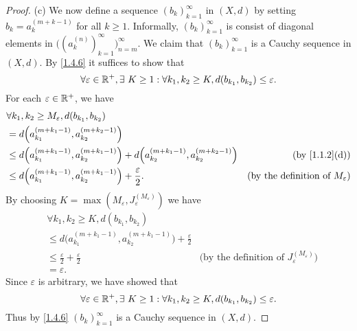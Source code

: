 \begin{proof}{(c)}
  We now define a sequence \((b_k)_{k = 1}^\infty\) in \((X, d)\) by setting \(b_k = a_k^{(m + k - 1)}\) for all \(k \geq 1\).
  Informally, \((b_k)_{k = 1}^\infty\) is consist of diagonal elements in \(\big((a_k^{(n)})_{k = 1}^\infty\big)_{n = m}^\infty\).
  We claim that \((b_k)_{k = 1}^\infty\) is a Cauchy sequence in \((X, d)\).
  By \cref{1.4.6} it suffices to show that
  \[
    \forall \varepsilon \in \mathbb{R}^+, \exists\ K \geq 1 : \forall k_1, k_2 \geq K, d(b_{k_1}, b_{k_2}) \leq \varepsilon.
  \]
  For each \(\varepsilon \in \mathbb{R}^+\), we have
  \begin{align*}
     & \forall k_1, k_2 \geq M_\varepsilon, d(b_{k_1}, b_{k_2})                                                                                                                         \\
     & = d\Big(a_{k_1}^{(m + k_1 - 1)}, a_{k_2}^{(m + k_2 - 1)}\Big)                                                                                                                    \\
     & \leq d\Big(a_{k_1}^{(m + k_1 - 1)}, a_{k_2}^{(m + k_1 - 1)}\Big) + d\Big(a_{k_2}^{(m + k_1 - 1)}, a_{k_2}^{(m + k_2 - 1)}\Big) & \text{(by \cref{1.1.2}(d))}                     \\
     & \leq d\Big(a_{k_1}^{(m + k_1 - 1)}, a_{k_2}^{(m + k_1 - 1)}\Big) + \frac{\varepsilon}{2}.                                      & \text{(by the definition of \(M_\varepsilon\))}
  \end{align*}
  By choosing \(K = \max(M_\varepsilon, J_\varepsilon^{(M_\varepsilon)})\) we have
  \begin{align*}
     & \forall k_1, k_2 \geq K, d(b_{k_1}, b_{k_2})                                                                                                                 \\
     & \leq d\Big(a_{k_1}^{(m + k_1 - 1)}, a_{k_2}^{(m + k_1 - 1)}\Big) + \frac{\varepsilon}{2}                                                                     \\
     & \leq \frac{\varepsilon}{2} + \frac{\varepsilon}{2}                                       & \text{(by the definition of \(J_\varepsilon^{(M_\varepsilon)}\))} \\
     & = \varepsilon.
  \end{align*}
  Since \(\varepsilon\) is arbitrary, we have showed that
  \[
    \forall \varepsilon \in \mathbb{R}^+, \exists\ K \geq 1 : \forall k_1, k_2 \geq K, d(b_{k_1}, b_{k_2}) \leq \varepsilon.
  \]
  Thus by \cref{1.4.6} \((b_k)_{k = 1}^\infty\) is a Cauchy sequence in \((X, d)\).


\end{proof}
